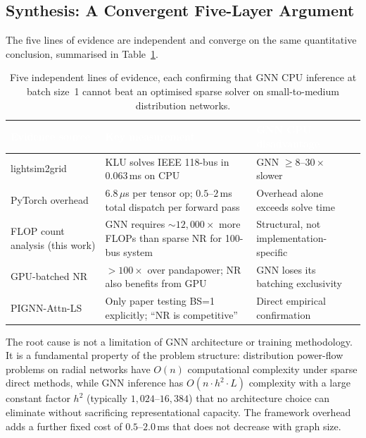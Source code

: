 \documentclass[11pt]{article}
\begin{document}
\subsection{Synthesis: A Convergent Five-Layer Argument}

The five lines of evidence are independent and converge on the same
quantitative conclusion, summarised in Table~\ref{tab:convergence}.

\begin{table}[ht]
\centering
\renewcommand{\arraystretch}{1.3}
\begin{tabular}{
  >{\raggedright\arraybackslash}p{3.8cm}
  >{\raggedright\arraybackslash}p{4.5cm}
  >{\centering\arraybackslash}p{4.0cm}
}
\toprule
\rowcolor{headerblue}
\textcolor{white}{\textbf{Evidence source}} &
\textcolor{white}{\textbf{Key measurement}} &
\textcolor{white}{\textbf{GNN CPU disadvantage}} \\
\midrule
\rowcolor{rowblue}
lightsim2grid~\cite{lightsim2grid}
  & KLU solves IEEE 118-bus in $0.063$\,ms on CPU
  & GNN $\geq 8$--$30\times$ slower \\
PyTorch overhead~\cite{pytorch_overhead}
  & $6.8\,\mu$s per tensor op;
    $0.5$--$2$\,ms total dispatch per forward pass
  & Overhead alone exceeds solve time \\
\rowcolor{rowblue}
FLOP count analysis (this work)
  & GNN requires ${\sim}12{,}000\times$ more FLOPs
    than sparse NR for 100-bus system
  & Structural, not implementation-specific \\
GPU-batched NR~\cite{Wang2021GPU}
  & $>100\times$ over pandapower; NR also benefits from GPU
  & GNN loses its batching exclusivity \\
\rowcolor{rowblue}
PIGNN-Attn-LS~\cite{Kim2026}
  & Only paper testing BS=1 explicitly;
    ``NR is competitive''
  & Direct empirical confirmation \\
\bottomrule
\end{tabular}
\caption{Five independent lines of evidence, each confirming that GNN CPU
  inference at batch size~1 cannot beat an optimised sparse solver on
  small-to-medium distribution networks.}
\label{tab:convergence}
\end{table}

The root cause is not a limitation of GNN architecture or training
methodology.  It is a fundamental property of the problem structure:
distribution power-flow problems on radial networks have $O(n)$
computational complexity under sparse direct methods, while GNN inference
has $O(n \cdot h^2 \cdot L)$ complexity with a large constant factor
$h^2$ (typically $1{,}024$--$16{,}384$) that no architecture choice can
eliminate without sacrificing representational capacity.  The framework
overhead adds a further fixed cost of $0.5$--$2.0$\,ms that does not
decrease with graph size.
\end{document}
